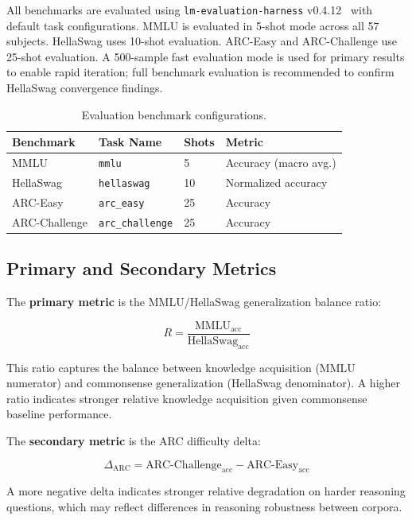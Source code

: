 All benchmarks are evaluated using \texttt{lm-evaluation-harness} v0.4.12~\cite{gao2024harness} with default task configurations. MMLU is evaluated in 5-shot mode across all 57 subjects. HellaSwag uses 10-shot evaluation. ARC-Easy and ARC-Challenge use 25-shot evaluation. A 500-sample fast evaluation mode is used for primary results to enable rapid iteration; full benchmark evaluation is recommended to confirm HellaSwag convergence findings.

\begin{table}[h]
\centering
\caption{Evaluation benchmark configurations.}
\begin{tabular}{llll}
\toprule
Benchmark & Task Name & Shots & Metric \\
\midrule
MMLU & \texttt{mmlu} & 5 & Accuracy (macro avg.) \\
HellaSwag & \texttt{hellaswag} & 10 & Normalized accuracy \\
ARC-Easy & \texttt{arc\_easy} & 25 & Accuracy \\
ARC-Challenge & \texttt{arc\_challenge} & 25 & Accuracy \\
\bottomrule
\end{tabular}
\end{table}

\subsection{Primary and Secondary Metrics}

The \textbf{primary metric} is the MMLU/HellaSwag generalization balance ratio:

\begin{equation}
    R = \frac{\text{MMLU}_{\text{acc}}}{\text{HellaSwag}_{\text{acc}}}
\end{equation}

This ratio captures the balance between knowledge acquisition (MMLU numerator) and commonsense generalization (HellaSwag denominator). A higher ratio indicates stronger relative knowledge acquisition given commonsense baseline performance.

The \textbf{secondary metric} is the ARC difficulty delta:

\begin{equation}
    \Delta_{\text{ARC}} = \text{ARC-Challenge}_{\text{acc}} - \text{ARC-Easy}_{\text{acc}}
\end{equation}

A more negative delta indicates stronger relative degradation on harder reasoning questions, which may reflect differences in reasoning robustness between corpora.

